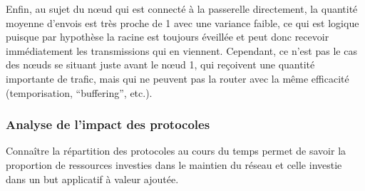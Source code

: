 Enfin, au sujet du nœud qui est connecté à la passerelle directement, la quantité moyenne d'envois est très proche de 1 avec une variance faible, ce qui est logique puisque par hypothèse la racine est toujours éveillée et peut donc recevoir immédiatement les transmissions qui en viennent.
Cependant, ce n'est pas le cas des nœuds se situant juste avant le nœud 1, qui reçoivent une quantité importante de trafic, mais qui ne peuvent pas la router avec la même efficacité (temporisation, ``buffering'', etc.).

\subsubsection{Analyse de l'impact des protocoles}
\label{supervision:protocols_analysis}

Connaître la répartition des protocoles au cours du temps permet de savoir la proportion de ressources investies dans le maintien du réseau et celle investie dans un but applicatif à valeur ajoutée.

